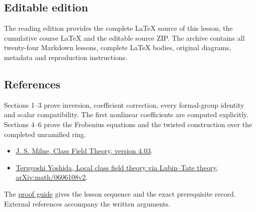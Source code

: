\documentclass[11pt,a4paper]{article}
\newcommand{\tightlist}{\setlength{\itemsep}{0pt}\setlength{\parskip}{0pt}}
\begin{document}
\subsection{Editable edition}\label{editable-edition}

The reading edition provides the complete LaTeX source of this lesson,
the cumulative course LaTeX and the editable source ZIP. The archive
contains all twenty-four Markdown lessons, complete LaTeX bodies,
original diagrams, metadata and reproduction instructions.

\subsection{References}\label{references}

Sections 1--3 prove inversion, coefficient correction, every
formal-group identity and scalar compatibility. The first nonlinear
coefficients are computed explicitly. Sections 4--6 prove the Frobenius
equations and the twisted construction over the completed unramified
ring.

\begin{itemize}
\tightlist
\item
  \href{https://www.jmilne.org/math/CourseNotes/CFT.pdf}{J. S. Milne,
  Class Field Theory, version 4.03}.
\item
  \href{https://arxiv.org/abs/math/0606108v2}{Teruyoshi Yoshida, Local
  class field theory via Lubin--Tate theory, arXiv:math/0606108v2}.
\end{itemize}

The \href{../free-proofs.html}{proof guide} gives the lesson sequence
and the exact prerequisite record. External references accompany the
written arguments.
\end{document}
